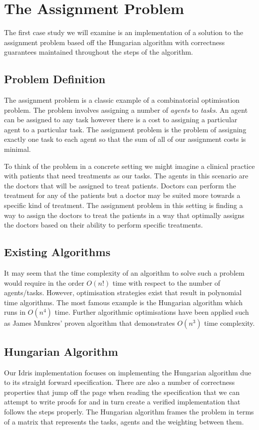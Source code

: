 \documentclass[a4paper, notitlepage]{report}
\begin{document}
\section{The Assignment Problem}
\label{sec:org20ef599}
The first case study we will examine is an implementation of a solution to the
assignment problem based off the Hungarian algorithm with correctness guarantees
maintained throughout the steps of the algorithm.

\subsection{Problem Definition}
\label{sec:org33d207d}
The assignment problem is a classic example of a combinatorial optimisation
problem. The problem involves assigning a number of \emph{agents} to \emph{tasks}. An agent
can be assigned to any task however there is a cost to assigning a particular
agent to a particular task. The assignment problem is the problem of assigning
exactly one task to each agent so that the sum of all of our assignment costs is
minimal.

To think of the problem in a concrete setting we might imagine a clinical
practice with patients that need treatments as our tasks. The agents in this
scenario are the doctors that will be assigned to treat patients. Doctors can
perform the treatment for any of the patients but a doctor may be suited more
towards a specific kind of treatment. The assignment problem in this setting is
finding a way to assign the doctors to treat the patients in a way that
optimally assigns the doctors based on their ability to perform specific
treatments.

\subsection{Existing Algorithms}
\label{sec:org5204c99}
It may seem that the time complexity of an algorithm to solve such a problem
would require in the order \(O(n!)\) time with respect to the number of
agents/tasks. However, optimisation strategies exist that result in polynomial
time algorithms. The most famous example is the Hungarian algorithm which runs
in \(O(n^4)\) time. Further algorithmic optimisations have been applied such as
James Munkres' proven algorithm \cite{munkres_assignment_1957} that demonstrates
\(O(n^3)\) time complexity.

\subsection{Hungarian Algorithm}
\label{sec:org1169887}
Our Idris implementation focuses on implementing the Hungarian algorithm due to
its straight forward specification. There are also a number of correctness
properties that jump off the page when reading the specification that we can
attempt to write proofs for and in turn create a verified implementation that
follows the steps properly. The Hungarian algorithm frames the problem in terms
of a matrix that represents the tasks, agents and the weighting between them.
\end{document}
